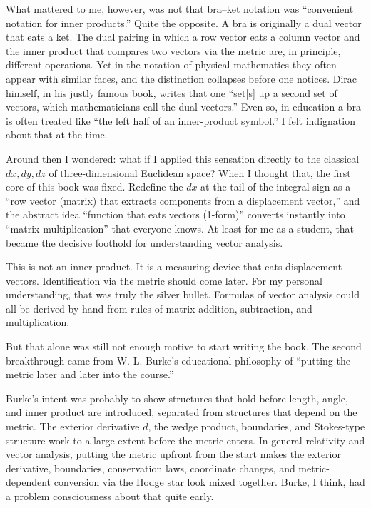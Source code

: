 \documentclass[a4paper,12pt,openany]{book}
\begin{document}
What mattered to me, however, was not that bra–ket notation was
``convenient notation for inner products.'' Quite the opposite. A bra is
originally a dual vector that eats a ket. The dual pairing in which a
row vector eats a column vector and the inner product that compares two
vectors via the metric are, in principle, different operations. Yet in
the notation of physical mathematics they often appear with similar
faces, and the distinction collapses before one notices. Dirac himself,
in his justly famous book, writes that one ``set{[}s{]} up a second set
of vectors, which mathematicians call the dual vectors.'' Even so, in
education a bra is often treated like ``the left half of an
inner-product symbol.'' I felt indignation about that at the time.

Around then I wondered: what if I applied this sensation directly to the
classical \(dx,dy,dz\) of three-dimensional Euclidean space? When I
thought that, the first core of this book was fixed. Redefine the \(dx\)
at the tail of the integral sign as a ``row vector (matrix) that
extracts components from a displacement vector,'' and the abstract idea
``function that eats vectors (1-form)'' converts instantly into ``matrix
multiplication'' that everyone knows. At least for me as a student, that
became the decisive foothold for understanding vector analysis.

This is not an inner product. It is a measuring device that eats
displacement vectors. Identification via the metric should come later.
For my personal understanding, that was truly the silver bullet.
Formulas of vector analysis could all be derived by hand from rules of
matrix addition, subtraction, and multiplication.

But that alone was still not enough motive to start writing the book.
The second breakthrough came from W. L. Burke's educational philosophy
of ``putting the metric later and later into the course.''

Burke's intent was probably to show structures that hold before length,
angle, and inner product are introduced, separated from structures that
depend on the metric. The exterior derivative \(d\), the wedge product,
boundaries, and Stokes-type structure work to a large extent before the
metric enters. In general relativity and vector analysis, putting the
metric upfront from the start makes the exterior derivative, boundaries,
conservation laws, coordinate changes, and metric-dependent conversion
via the Hodge star look mixed together. Burke, I think, had a problem
consciousness about that quite early.
\end{document}
